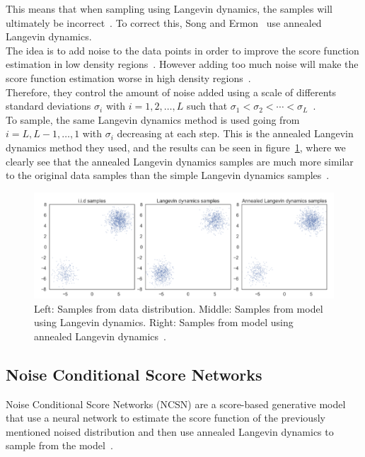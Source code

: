 \documentclass[twoside]{article}
\numberwithin{equation}{section}
\numberwithin{figure}{section}
\begin{document}
This means that when sampling using Langevin dynamics, the samples will ultimately be incorrect~\cite{song2020generative}.
To correct this, Song and Ermon~\cite{song2020generative} use annealed Langevin dynamics. \\
The idea is to add noise to the data points in order to improve the score function estimation in low density regions~\cite{songblog}. However adding too much noise will make the score function estimation worse in high density regions~\cite{songblog}. \\
Therefore, they control the amount of noise added using a scale of differents standard deviations $\sigma_i$ with $i = 1, 2, \ldots, L$ such that $\sigma_1 < \sigma_2 < \cdots < \sigma_L$~\cite{songblog,song2020generative}. \\
To sample, the same Langevin dynamics method is used going from $i = L, L-1, \ldots, 1$ with $\sigma_i$ decreasing at each step. This is the annealed Langevin dynamics method they used, and the results can be seen in figure~\ref{fig:langevin_samples}, where we clearly see that the annealed Langevin dynamics samples are much more similar to the original data samples than the simple Langevin dynamics samples~\cite{songblog, song2020generative}. \\ 
\begin{figure}[h]
  \begin{center}
    \includegraphics[width=\textwidth]{images/langevin_samples.png}
    \caption{Left: Samples from data distribution. Middle: Samples from model using Langevin dynamics. Right: Samples from model using annealed Langevin dynamics~\cite{song2020generative}.}
    \label{fig:langevin_samples}
  \end{center}
\end{figure}
\subsection{Noise Conditional Score Networks}
Noise Conditional Score Networks (NCSN) are a score-based generative model that use a neural network to estimate the score function of the previously mentioned noised distribution and then use annealed Langevin dynamics to sample from the model~\cite{song2020generative}.
\end{document}
